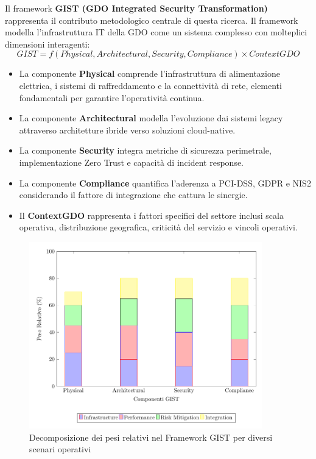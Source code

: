 \documentclass[12pt,a4paper,oneside]{book}
\numberwithin{figure}{chapter} %
\numberwithin{table}{chapter}  %
\begin{document}
Il framework \textbf{GIST (GDO Integrated Security Transformation)} rappresenta il contributo metodologico centrale di questa ricerca. 
Il framework modella l'infrastruttura IT della GDO come un sistema complesso con molteplici dimensioni interagenti:
\begin{equation}
   GIST = f(Physical, Architectural, Security, Compliance) × ContextGDO 
\end{equation}

\begin{itemize}
\item 
La componente \textbf{Physical} comprende l'infrastruttura di alimentazione
elettrica, i sistemi di raffreddamento e la connettività di rete,
elementi fondamentali per garantire l'operatività continua.
\item 
La componente \textbf{Architectural} modella l'evoluzione dai sistemi legacy
attraverso architetture ibride verso soluzioni cloud-native.
\item
La componente \textbf{Security} integra metriche di sicurezza perimetrale, implementazione Zero Trust e capacità di incident response.
\item La componente \textbf{Compliance} quantifica l'aderenza a PCI-DSS, GDPR e NIS2 considerando il fattore di integrazione che cattura le sinergie. 
\item 
Il \textbf{ContextGDO} rappresenta i fattori specifici del settore inclusi scala
operativa, distribuzione geografica, criticità del servizio e vincoli
operativi.
\end{itemize}
\begin{figure}[htbp]
    \centering
    \includegraphics[width=0.9\textwidth]{figura 1-3}
    \caption{Decomposizione dei pesi relativi nel Framework GIST per diversi scenari operativi}
    \label{fig:gist_decomposition}
\end{figure}
\end{document}
